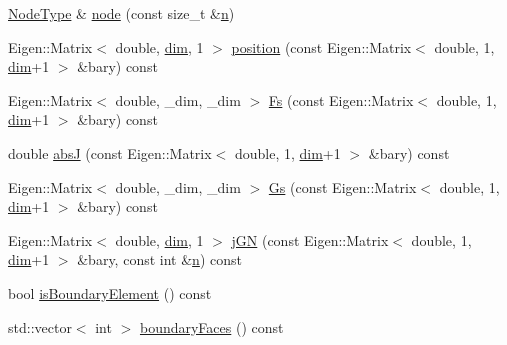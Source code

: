 \begin{DoxyCompactItemize}
\item 
\hyperlink{classmodel_1_1_lagrange_element_a112bda9c061442a6c52f06c61e3ab123}{Node\+Type} \& \hyperlink{classmodel_1_1_lagrange_element_a7d0790fcb34db157b12d254ba7773b0e}{node} (const size\+\_\+t \&\hyperlink{_f_e_m_2linear__elasticity__3d_2tetgen_2generate_p_o_l_ycube_8m_a74637fc31d6aedd6d61cdc0c8154bc13}{n})
\item 
Eigen\+::\+Matrix$<$ double, \hyperlink{classmodel_1_1_lagrange_element_a56d161032b73c07c77326cfba73d731d}{dim}, 1 $>$ \hyperlink{classmodel_1_1_lagrange_element_ac74d4ee2e02d39a3a1ebf90ade37d6f5}{position} (const Eigen\+::\+Matrix$<$ double, 1, \hyperlink{classmodel_1_1_lagrange_element_a56d161032b73c07c77326cfba73d731d}{dim}+1 $>$ \&bary) const 
\item 
Eigen\+::\+Matrix$<$ double, \+\_\+dim, \+\_\+dim $>$ \hyperlink{classmodel_1_1_lagrange_element_a46e9f92d805638076f15764d8324812e}{Fs} (const Eigen\+::\+Matrix$<$ double, 1, \hyperlink{classmodel_1_1_lagrange_element_a56d161032b73c07c77326cfba73d731d}{dim}+1 $>$ \&bary) const 
\item 
double \hyperlink{classmodel_1_1_lagrange_element_a9d27e9c9bcdd99d7ac8ca51158abe603}{abs\+J} (const Eigen\+::\+Matrix$<$ double, 1, \hyperlink{classmodel_1_1_lagrange_element_a56d161032b73c07c77326cfba73d731d}{dim}+1 $>$ \&bary) const 
\item 
Eigen\+::\+Matrix$<$ double, \+\_\+dim, \+\_\+dim $>$ \hyperlink{classmodel_1_1_lagrange_element_a8bd65ca1795731e9237f56b2a2dd7796}{Gs} (const Eigen\+::\+Matrix$<$ double, 1, \hyperlink{classmodel_1_1_lagrange_element_a56d161032b73c07c77326cfba73d731d}{dim}+1 $>$ \&bary) const 
\item 
Eigen\+::\+Matrix$<$ double, \hyperlink{classmodel_1_1_lagrange_element_a56d161032b73c07c77326cfba73d731d}{dim}, 1 $>$ \hyperlink{classmodel_1_1_lagrange_element_a67a839fe3fc39d9dc5e21affda92cada}{j\+G\+N} (const Eigen\+::\+Matrix$<$ double, 1, \hyperlink{classmodel_1_1_lagrange_element_a56d161032b73c07c77326cfba73d731d}{dim}+1 $>$ \&bary, const int \&\hyperlink{_f_e_m_2linear__elasticity__3d_2tetgen_2generate_p_o_l_ycube_8m_a74637fc31d6aedd6d61cdc0c8154bc13}{n}) const 
\item 
bool \hyperlink{classmodel_1_1_lagrange_element_a27ad29c39eb1d44b9f28b90ddf0a9756}{is\+Boundary\+Element} () const 
\item 
std\+::vector$<$ int $>$ \hyperlink{classmodel_1_1_lagrange_element_abc241a9820db83910df48b5fae885217}{boundary\+Faces} () const 
\end{DoxyCompactItemize}
